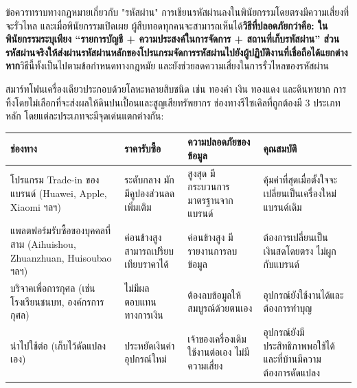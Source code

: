 \begin{tcbwarn}{ข้อควรทราบทางกฎหมายเกี่ยวกับ "รหัสผ่าน"}
การเขียนรหัสผ่านลงในพินัยกรรมโดยตรงมีความเสี่ยงที่จะรั่วไหล และเมื่อพินัยกรรมเปิดเผย ผู้สืบทอดทุกคนจะสามารถเห็นได้\textbf{วิธีที่ปลอดภัยกว่าคือ: ในพินัยกรรมระบุเพียง “รายการบัญชี + ความประสงค์ในการจัดการ + สถานที่เก็บรหัสผ่าน” ส่วนรหัสผ่านจริงให้ส่งผ่านรหัสผ่านหลักของโปรแกรมจัดการรหัสผ่านไปยังผู้ปฏิบัติงานที่เชื่อถือได้แยกต่างหาก}วิธีนี้ทั้งเป็นไปตามข้อกำหนดทางกฎหมัย และยังช่วยลดความเสี่ยงในการรั่วไหลของรหัสผ่าน

\end{tcbwarn}


สมาร์ทโฟนเครื่องเดียวประกอบด้วยโลหะหลายสิบชนิด เช่น ทองคำ เงิน ทองแดง และดินหายาก การทิ้งโดยไม่เลือกที่จะส่งผลให้ดินปนเปื้อนและสูญเสียทรัพยากร ช่องทางรีไซเคิลที่ถูกต้องมี 3 ประเภทหลัก โดยแต่ละประเภทจะมีจุดเด่นแตกต่างกัน:

\begin{center}
\begin{tabularx}{\linewidth}{|X|X|X|X|}
\hline
\textbf{ช่องทาง} & \textbf{ราคารับซื้อ} & \textbf{ความปลอดภัยของข้อมูล} & \textbf{คุณสมบัติ} \tabularnewline
\hline
โปรแกรม Trade-in ของแบรนด์ (Huawei, Apple, Xiaomi ฯลฯ) & ระดับกลาง มักมีคูปองส่วนลดเพิ่มเติม & สูงสุด มีกระบวนการมาตรฐานจากแบรนด์ & คุ้มค่าที่สุดเมื่อตั้งใจจะเปลี่ยนเป็นเครื่องใหม่แบรนด์เดิม \tabularnewline
แพลตฟอร์มรับซื้อของบุคคลที่สาม (Aihuishou, Zhuanzhuan, Huisoubao ฯลฯ) & ค่อนข้างสูง สามารถเปรียบเทียบราคาได้ & ค่อนข้างสูง มีรายงานการลบข้อมูล & ต้องการเปลี่ยนเป็นเงินสดโดยตรง ไม่ผูกกับแบรนด์ \tabularnewline
บริจาคเพื่อการกุศล (เช่น โรงเรียนชนบท, องค์กรการกุศล) & ไม่มีผลตอบแทนทางการเงิน & ต้องลบข้อมูลให้สมบูรณ์ด้วยตนเอง & อุปกรณ์ยังใช้งานได้และต้องการทำบุญ \tabularnewline
นำไปใช้ต่อ (เก็บไว้ดัดแปลงเอง) & ประหยัดเงินค่าอุปกรณ์ใหม่ & เจ้าของเครื่องเดิมใช้งานต่อเอง ไม่มีความเสี่ยง & อุปกรณ์ยังมีประสิทธิภาพพอใช้ได้ และที่บ้านมีความต้องการดัดแปลง \tabularnewline
\hline
\end{tabularx}
\end{center}

